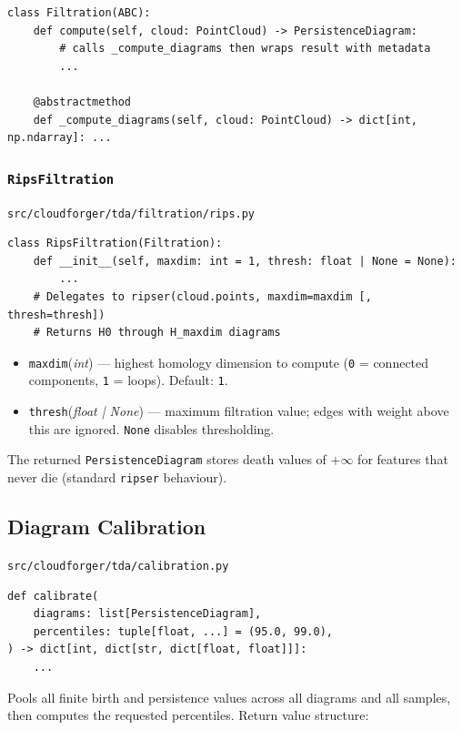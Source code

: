 \documentclass[11pt, a4paper]{article}
\newcommand{\code}[1]{\texttt{#1}}
\newcommand{\pyfile}[1]{\texttt{\small #1}}
\newcommand{\typename}[1]{\textbf{\texttt{#1}}}
\newcommand{\param}[2]{\texttt{#1}\;(\textit{#2})}
\begin{document}
\begin{lstlisting}
class Filtration(ABC):
    def compute(self, cloud: PointCloud) -> PersistenceDiagram:
        # calls _compute_diagrams then wraps result with metadata
        ...

    @abstractmethod
    def _compute_diagrams(self, cloud: PointCloud) -> dict[int, np.ndarray]: ...
\end{lstlisting}

\subsubsection{\typename{RipsFiltration}}
\pyfile{src/cloudforger/tda/filtration/rips.py}

\begin{lstlisting}
class RipsFiltration(Filtration):
    def __init__(self, maxdim: int = 1, thresh: float | None = None):
        ...
    # Delegates to ripser(cloud.points, maxdim=maxdim [, thresh=thresh])
    # Returns H0 through H_maxdim diagrams
\end{lstlisting}

\begin{itemize}
  \item \param{maxdim}{int} --- highest homology dimension to compute
        (\code{0} = connected components, \code{1} = loops).
        Default: \code{1}.
  \item \param{thresh}{float | None} --- maximum filtration value;
        edges with weight above this are ignored.
        \code{None} disables thresholding.
\end{itemize}

The returned \code{PersistenceDiagram} stores death values of
$+\infty$ for features that never die (standard \code{ripser} behaviour).

\subsection{Diagram Calibration}
\pyfile{src/cloudforger/tda/calibration.py}

\begin{lstlisting}
def calibrate(
    diagrams: list[PersistenceDiagram],
    percentiles: tuple[float, ...] = (95.0, 99.0),
) -> dict[int, dict[str, dict[float, float]]]:
    ...
\end{lstlisting}

Pools all finite birth and persistence values across all diagrams and
all samples, then computes the requested percentiles.
Return value structure:
\end{document}
